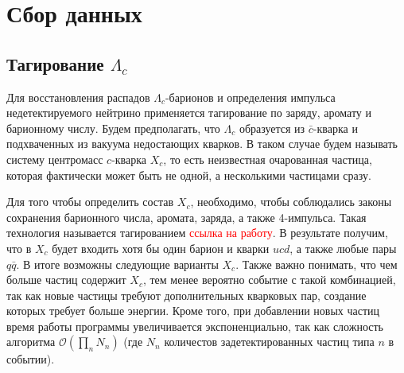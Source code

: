 \section{Сбор данных}

\subsection{Тагирование $\Lambda_c$}

Для восстановления распадов $\Lambda_c$-барионов и определения импульса недетектируемого нейтрино применяется тагирование по заряду, аромату и барионному числу. Будем предполагать, что $\Lambda_c$ образуется из $\bar{c}$-кварка и подхваченных из вакуума недостающих кварков. В таком случае будем называть систему центромасс $c$-кварка $X_c$, то есть неизвестная очарованная частица, которая фактически может быть не одной, а несколькими частицами сразу.

\begin{figure}[h!]
    \centering
\end{figure}

Для того чтобы определить состав $X_c$, необходимо, чтобы соблюдались законы 
сохранения барионного числа, аромата, заряда, а также 4-импульса. Такая 
технология называется тагированием \textcolor{red}{ссылка на работу}. В 
результате получим, что в $X_c$ будет входить хотя бы один барион и кварки 
$u c d$, а также любые пары $q \bar{q}$. В итоге возможны следующие варианты 
$X_c$. Также важно понимать, что чем больше частиц содержит $X_c$, тем менее 
вероятно событие с такой комбинацией, так как новые частицы требуют 
дополнительных кварковых пар, создание которых требует больше энергии. 
Кроме того, при добавлении новых частиц время работы программы увеличивается 
экспоненциально, так как сложность алгоритма $\mathcal{O}(\prod_n N_n)$ 
(где $N_n$ количестов задетектированных частиц типа $n$ в событии).

